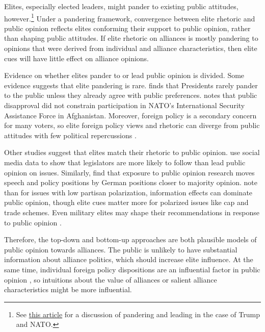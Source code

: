 \documentclass[12pt]{article}
\begin{document}
Elites, especially elected leaders, might pander to existing public attitudes, however.\footnote{See \href{https://fivethirtyeight.com/features/is-trump-fueling-republicans-concerns-about-nato-or-echoing-them/}{this article} for a discussion of pandering and leading in the case of Trump and NATO.}
Under a pandering framework, convergence between elite rhetoric and public opinion reflects elites conforming their support to public opinion, rather than shaping public attitudes. 
If elite rhetoric on alliances is mostly pandering to opinions that were derived from individual and alliance characteristics, then elite cues will have little effect on alliance opinions.


Evidence on whether elites pander to or lead public opinion is divided.
Some evidence suggests that elite pandering is rare. 
\citet{Canes-Wrone2006} finds that Presidents rarely pander to the public unless they already agree with public preferences.
\citet{Kreps2010} notes that public disapproval did not constrain participation in NATO's International Security Assistance Force in Afghanistan. 
Moreover, foreign policy is a secondary concern for many voters, so elite foreign policy views and rhetoric can diverge from public attitudes with few political repercussions \citep{BusbyMonten2012}. 


Other studies suggest that elites match their rhetoric to public opinion. 
\citet{Barberaetal2019} use social media data to show that legislators are more likely to follow than lead public opinion on issues. 
Similarly, \citet{HagerHilbig2020} find that exposure to public opinion research moves speech and policy positions by German positions closer to majority opinion. 
\citet{GuisingerSaunders2017} note than for issues with low partisan polarization, information effects can dominate public opinion, though elite cues matter more for polarized issues like cap and trade schemes. 
Even military elites may shape their recommendations in response to public opinion \citep{LinGreenberg2021}. 


Therefore, the top-down and bottom-up approaches are both plausible models of public opinion towards alliances. 
The public is unlikely to have substantial information about alliance politics, which should increase elite influence. 
At the same time, individual foreign policy dispositions are an influential factor in public opinion \citep{Herrmannetal2009, KertzerZeitzoff2017}, so intuitions about the value of alliances or salient alliance characteristics might be more influential. 
\end{document}
